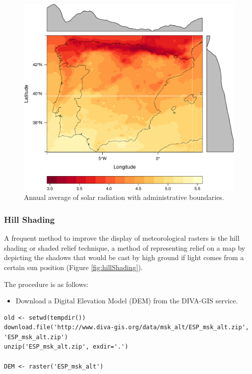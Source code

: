 \begin{figure}[htb]
\centering
\includegraphics[width=.9\linewidth]{figs/leveplotSISavBoundaries.pdf}
\caption{\label{fig:levelplotCMSAF_boundaries}Annual average of solar radiation with administrative boundaries.}
\end{figure}

\subsubsection{Hill Shading}
\label{sec-1-1-1}
A frequent method to improve the display of meteorological rasters is
the hill shading or shaded relief technique, a method of representing
relief on a map by depicting the shadows that would be cast by high
ground if light comes from a certain sun position (Figure
\ref{fig:hillShading}).

The procedure is as follows:

\begin{itemize}
\item Download a Digital Elevation Model (DEM) from the DIVA-GIS service.
\end{itemize}

\lstset{language=R,numbers=none}
\begin{lstlisting}
old <- setwd(tempdir())
download.file('http://www.diva-gis.org/data/msk_alt/ESP_msk_alt.zip', 'ESP_msk_alt.zip')
unzip('ESP_msk_alt.zip', exdir='.')

DEM <- raster('ESP_msk_alt')
\end{lstlisting}


